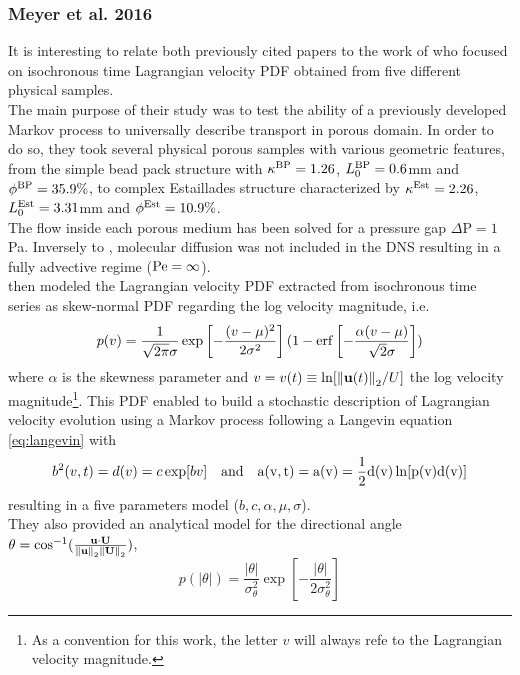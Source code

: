\subsubsection{Meyer et al. 2016}
It is interesting to relate both previously cited papers to the work of \citet{Meyer2016} who focused on isochronous time Lagrangian velocity PDF obtained from five different physical samples. \\
The main purpose of their study was to test the ability of a previously developed Markov process to universally describe transport in porous domain.
In order to do so, they took several physical porous samples with various geometric features, from the simple bead pack structure with $\kappa^{\rm{BP}} = 1.26$, $L^{\rm{BP}}_0=0.6$mm and $\phi^{\rm{BP}}=35.9\%$, to complex Estaillades structure characterized by $\kappa^{\rm{Est}} = 2.26$, $L_0^{\rm{Est}}=3.31$mm and $\phi^{\rm{Est}}=10.9\%$.\\
The flow inside each porous medium has been solved for a pressure gap $\Delta\textrm{P}=1$Pa. 
Inversely to \citet{Dentz2017}, molecular diffusion was not included in the DNS resulting in a fully advective regime ($\mathrm{Pe}=\infty$).\\
\citeauthor{Meyer2016} then modeled the Lagrangian velocity PDF extracted from isochronous time series as skew-normal PDF regarding the log velocity magnitude, i.e.
\begin{equation}\label{eq:meyer_skew}
p(v)=\frac{1}{\sqrt{2\pi}\sigma}\exp\left[-\frac{(v-\mu)^2}{2\sigma^2}\right](1-\erf\left[-\frac{\alpha(v-\mu)}{\sqrt{2}\sigma}\right])
\end{equation}
where $\alpha$ is the skewness parameter and $v=v(t)\equiv\ln[\norm{\textbf{u}(t)}_2/U]$ the log velocity magnitude\footnote{As a convention for this work, the letter $v$ will always refe to the Lagrangian velocity magnitude.}.
This PDF enabled to build a stochastic description of Lagrangian velocity evolution using a Markov process following a Langevin equation \eqref{eq:langevin} with 
\begin{equation}\label{eq:meyer_model_v}
b^2(v,t)=d(v)=c\exp[bv] \quad\rm{and}\quad a(v,t)=a(v)=\frac{1}{2}d(v)\ln[p(v)d(v)]
\end{equation}
resulting in a five parameters model ($b,c,\alpha,\mu,\sigma$).\\
They also provided an analytical model for the directional angle $\theta=\cos^{-1}(\frac{\textbf{u}\cdot\textbf{U}}{\norm{\textbf{u}}_2\norm{\textbf{U}}_2})$,
\[p(|\theta|)=\frac{|\theta|}{\sigma_\theta^2}\exp\left[-\frac{|\theta|}{2\sigma_\theta^2}\right]\]
